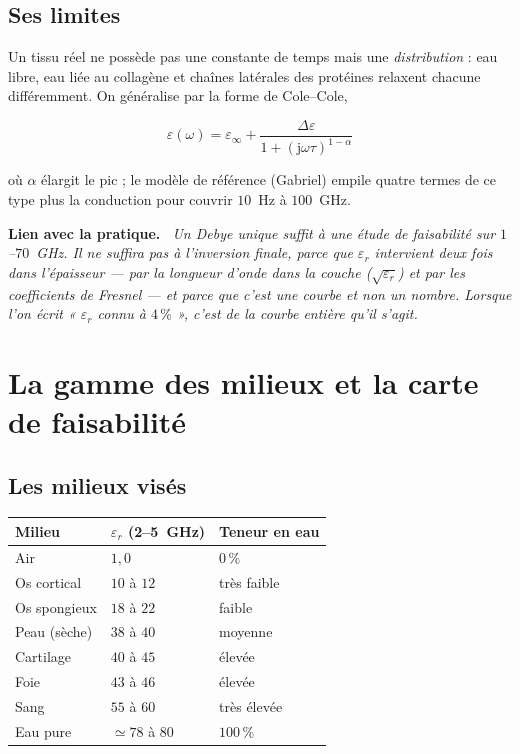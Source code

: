 \documentclass[11pt,a4paper]{article}
\newenvironment{implication}%
  {\par\medskip\begin{lrbox}{\implbox}\begin{minipage}{0.95\textwidth}%
   \textbf{Lien avec la pratique.}\itshape\ }%
  {\end{minipage}\end{lrbox}\noindent\fbox{\usebox{\implbox}}\par\medskip}
\newcommand{\eps}{\varepsilon_r}
\newcommand{\jj}{\mathrm{j}}
\begin{document}
\subsection{Ses limites}

Un tissu réel ne possède pas une constante de temps mais une
\emph{distribution} : eau libre, eau liée au collagène et chaînes latérales des
protéines relaxent chacune différemment. On généralise par la forme de
Cole--Cole,

\begin{equation}
\varepsilon(\omega) = \varepsilon_\infty
   + \frac{\Delta\varepsilon}{1 + (\jj\omega\tau)^{1-\alpha}}
\end{equation}

où $\alpha$ élargit le pic ; le modèle de référence (Gabriel) empile quatre
termes de ce type plus la conduction pour couvrir $10$~Hz à $100$~GHz.

\begin{implication}
Un Debye unique suffit à une étude de faisabilité sur $1$--$70$~GHz. Il ne
suffira \emph{pas} à l'inversion finale, parce que $\eps$ intervient deux fois
dans l'épaisseur --- par la longueur d'onde dans la couche ($\sqrt{\eps}$) et
par les coefficients de Fresnel --- et parce que c'est une courbe et non un
nombre. Lorsque l'on écrit « $\eps$ connu à $4\,\%$ », c'est de la courbe
entière qu'il s'agit.
\end{implication}

\section{La gamme des milieux et la carte de faisabilité}
\label{sec:milieux}

\subsection{Les milieux visés}

\begin{table}[h]
\centering
\begin{tabular}{lll}
\toprule
Milieu & $\eps$ (2--5~GHz) & Teneur en eau \\
\midrule
Air              & $1{,}0$      & $0\,\%$ \\
Os cortical      & $10$ à $12$  & très faible \\
Os spongieux     & $18$ à $22$  & faible \\
Peau (sèche)     & $38$ à $40$  & moyenne \\
Cartilage        & $40$ à $45$  & élevée \\
Foie             & $43$ à $46$  & élevée \\
Sang             & $55$ à $60$  & très élevée \\
Eau pure         & $\simeq 78$ à $80$ & $100\,\%$ \\
\bottomrule
\end{tabular}
\end{table}
\end{document}
